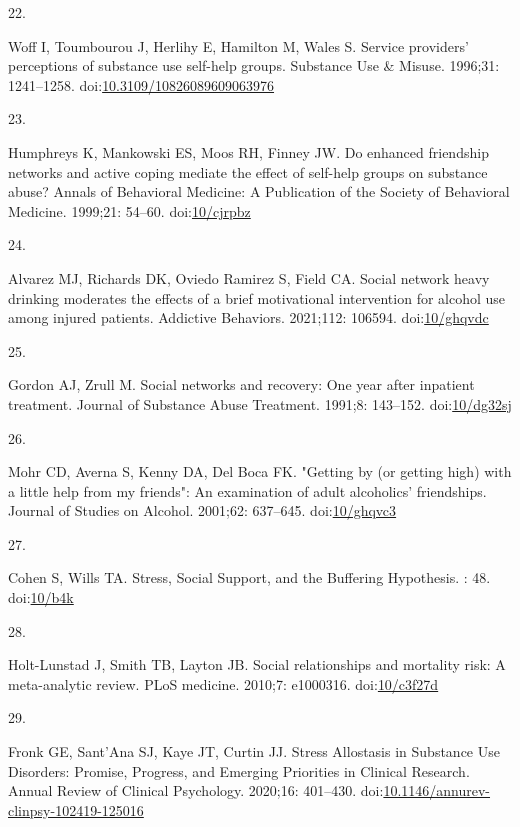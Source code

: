 \documentclass[
  letterpaper,
  DIV=11,
  numbers=noendperiod]{scrartcl}
\newlength{\cslhangindent}
\newlength{\csllabelwidth}
\newenvironment{CSLReferences}[2] %
 {\begin{list}{}{%
  \setlength{\itemindent}{0pt}
  \setlength{\leftmargin}{0pt}
  \setlength{\parsep}{0pt}
  \ifodd #1
   \setlength{\leftmargin}{\cslhangindent}
   \setlength{\itemindent}{-1\cslhangindent}
  \fi
  \setlength{\itemsep}{#2\baselineskip}}}
 {\end{list}}
\newcommand{\CSLLeftMargin}[1]{\parbox[t]{\csllabelwidth}{\strut#1\strut}}
\newcommand{\CSLRightInline}[1]{\parbox[t]{\linewidth - \csllabelwidth}{\strut#1\strut}}
\begin{document}
\begin{CSLReferences}{0}{1}
\CSLLeftMargin{22. }%
\CSLRightInline{Woff I, Toumbourou J, Herlihy E, Hamilton M, Wales S.
Service providers' perceptions of substance use self-help groups.
Substance Use \& Misuse. 1996;31: 1241--1258.
doi:\href{https://doi.org/10.3109/10826089609063976}{10.3109/10826089609063976}}

\CSLLeftMargin{23. }%
\CSLRightInline{Humphreys K, Mankowski ES, Moos RH, Finney JW. Do
enhanced friendship networks and active coping mediate the effect of
self-help groups on substance abuse? Annals of Behavioral Medicine: A
Publication of the Society of Behavioral Medicine. 1999;21: 54--60.
doi:\href{https://doi.org/10/cjrpbz}{10/cjrpbz}}

\CSLLeftMargin{24. }%
\CSLRightInline{Alvarez MJ, Richards DK, Oviedo Ramirez S, Field CA.
Social network heavy drinking moderates the effects of a brief
motivational intervention for alcohol use among injured patients.
Addictive Behaviors. 2021;112: 106594.
doi:\href{https://doi.org/10/ghqvdc}{10/ghqvdc}}

\CSLLeftMargin{25. }%
\CSLRightInline{Gordon AJ, Zrull M. Social networks and recovery: {One}
year after inpatient treatment. Journal of Substance Abuse Treatment.
1991;8: 143--152. doi:\href{https://doi.org/10/dg32sj}{10/dg32sj}}

\CSLLeftMargin{26. }%
\CSLRightInline{Mohr CD, Averna S, Kenny DA, Del Boca FK. "{Getting} by
(or getting high) with a little help from my friends": An examination of
adult alcoholics' friendships. Journal of Studies on Alcohol. 2001;62:
637--645. doi:\href{https://doi.org/10/ghqvc3}{10/ghqvc3}}

\CSLLeftMargin{27. }%
\CSLRightInline{Cohen S, Wills TA. Stress, {Social Support}, and the
{Buffering Hypothesis}. : 48. doi:\href{https://doi.org/10/b4k}{10/b4k}}

\CSLLeftMargin{28. }%
\CSLRightInline{Holt-Lunstad J, Smith TB, Layton JB. Social
relationships and mortality risk: A meta-analytic review. PLoS medicine.
2010;7: e1000316. doi:\href{https://doi.org/10/c3f27d}{10/c3f27d}}

\CSLLeftMargin{29. }%
\CSLRightInline{Fronk GE, Sant'Ana SJ, Kaye JT, Curtin JJ. Stress
{Allostasis} in {Substance Use Disorders}: {Promise}, {Progress}, and
{Emerging Priorities} in {Clinical Research}. Annual Review of Clinical
Psychology. 2020;16: 401--430.
doi:\href{https://doi.org/10.1146/annurev-clinpsy-102419-125016}{10.1146/annurev-clinpsy-102419-125016}}


\end{CSLReferences}
\end{document}
